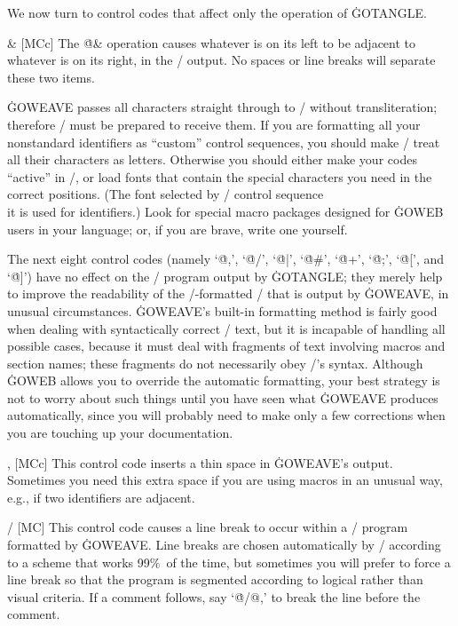 \subsec
We now turn to control codes that affect only the operation of
\.{GOTANGLE}.

\@\& [MCc] The \.{@\&} operation causes whatever is on its left to be
adjacent to whatever is on its right, in the \GO/ output. No spaces or
line breaks will separate these two items.

\more
\.{GOWEAVE} passes all characters straight through to \TEX/ without
transliteration; therefore \TEX/ must be prepared to receive them.
If you are formatting all your nonstandard identifiers as ``custom''
control sequences, you should
make \TEX/ treat all their characters as letters. Otherwise you should either
make your codes ``active'' in \TEX/, or load fonts that
contain the special characters you need in the correct positions.
(The font selected by \TEX/ control sequence \.{\\it} is used for
identifiers.)
Look for special macro packages designed for \.{GOWEB} users in your language;
or, if you are brave, write one yourself.

\subsec
The next eight control codes (namely `\.{@,}', `\.{@/}', `\.{@|}', `\.{@\#}',
`\.{@+}', `\.{@;}', `\.{@[}', and `\.{@]}') have no effect on the \GO/
program output by \.{GOTANGLE}; they merely help to improve the readability
of the \TEX/-formatted \GO/ that is output by \.{GOWEAVE}, in unusual
circumstances. \.{GOWEAVE}'s built-in formatting method is fairly good
when dealing with syntactically correct \GO/ text, but
it is incapable of handling all possible cases, because it must deal with
fragments of text involving macros and section names; these fragments do
not necessarily obey \GO/'s syntax. Although \.{GOWEB} allows you to
override the automatic formatting, your best strategy is not to worry
about such things until you have seen what \.{GOWEAVE} produces automatically,
since you will probably need to make only a few corrections when you are
touching up your documentation.

\@, [MCc] This control code inserts a thin space in \.{GOWEAVE}'s output.
Sometimes you need this extra space if you are using
macros in an unusual way, e.g., if two identifiers are adjacent.

\@/ [MC] This control code causes a line break to occur within a \GO/
program formatted by \.{GOWEAVE}. Line breaks
are chosen automatically by \TEX/ according to a scheme that works 99\%\
of the time, but sometimes you will prefer to force a line break so that
the program is segmented according to logical rather than visual
criteria. If a comment follows, say `\.{@/@,}' to break the line
before the comment.

